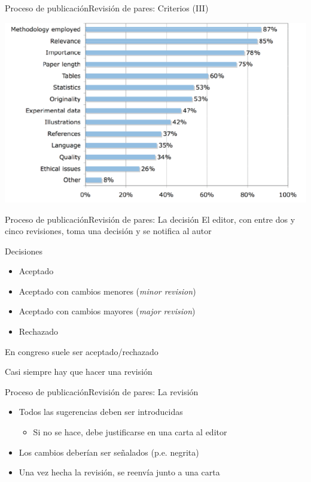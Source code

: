 \documentclass{beamer}
\begin{document}
\begin{frame}{Proceso de publicación}{Revisión de pares: Criterios (III)}
	 \begin{center}
	    \includegraphics[width=0.9\linewidth]{figs/revision.png}
 	 \end{center}
\end{frame}

\begin{frame}{Proceso de publicación}{Revisión de pares: La decisión}
	El editor, con entre dos y cinco revisiones, toma una decisión y se notifica al autor
 	\begin{block}{Decisiones}
   		\begin{itemize}
			\item Aceptado
			\item Aceptado con cambios menores (\textit{minor revision})
			\item Aceptado con cambios mayores (\textit{major revision})
			\item Rechazado
		\end{itemize}
	\end{block}
	En congreso suele ser aceptado/rechazado

	\alert{Casi siempre hay que hacer una revisión}
\end{frame}

\begin{frame}{Proceso de publicación}{Revisión de pares: La revisión}
  	\begin{itemize}
		\item Todos las sugerencias deben ser introducidas
		\begin{itemize}
			\item Si no se hace, debe justificarse en una carta al editor
		\end{itemize}
		\item Los cambios deberían ser señalados (p.e. negrita)
		\item Una vez hecha la revisión, se reenvía junto a una carta
	\end{itemize}

\end{frame}
\end{document}

